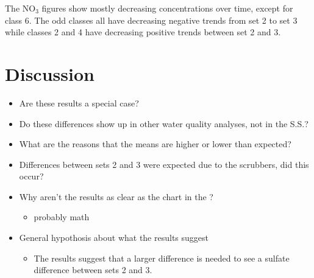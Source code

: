 The NO$_3$ figures show mostly decreasing concentrations over time, except for class 6.
The odd classes all have decreasing negative trends from set 2 to set 3 while classes 2 and 4 have decreasing positive trends between set 2 and 3.



\section{Discussion}
\begin{itemize}
	\item Are these results a special case?
	\item Do these differences show up in other water quality analyses, not in the S.S.?
	\item What are the reasons that the means are higher or lower than expected?
	\item Differences between sets 2 and 3 were expected due to the scrubbers, did this occur?
	\item Why aren't the results as clear as the chart in the \citep{cai2012}?
	\begin{itemize}
		\item probably math
	\end{itemize}
	\item General hypothosis about what the results suggest
	\begin{itemize}
		\item The results suggest that a larger difference is needed to see a sulfate difference between sets 2 and 3.
	\end{itemize}
\end{itemize}
